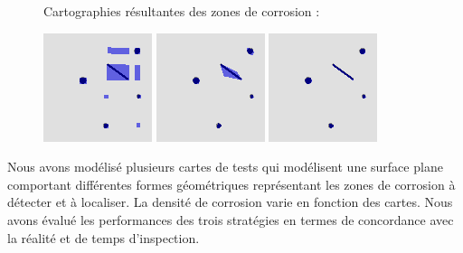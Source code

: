 \documentclass[a0paper,portrait]{baposter}
\begin{document}
\begin{poster}
{\begin{figure}
				Cartographies résultantes des zones de corrosion :
				\begin{center}
					\includegraphics[width=0.3\linewidth]{graphics/both_example_par.png}
					\includegraphics[width=0.3\linewidth]{graphics/both_example_sn.png}
					\includegraphics[width=0.3\linewidth]{graphics/both_example_ip.png}
				\end{center}
			\end{figure}

			Nous avons modélisé plusieurs cartes de tests qui modélisent une surface plane comportant différentes formes géométriques représentant les zones de corrosion à détecter et à localiser.
			La densité de corrosion varie en fonction des cartes.
			Nous avons évalué les performances des trois stratégies en termes de concordance avec la réalité et de temps d'inspection.

			\vspace{10pt}

}
\end{poster}
\end{document}

